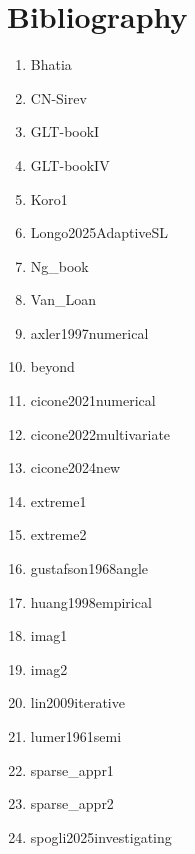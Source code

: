 \documentclass[11pt]{article}
\begin{document}
\section*{Bibliography}
\begin{enumerate}[leftmargin=*]
  \item Bhatia
  \item CN-Sirev
  \item GLT-bookI
  \item GLT-bookIV
  \item Koro1
  \item Longo2025AdaptiveSL
  \item Ng\_book
  \item Van\_Loan
  \item axler1997numerical
  \item beyond
  \item cicone2021numerical
  \item cicone2022multivariate
  \item cicone2024new
  \item extreme1
  \item extreme2
  \item gustafson1968angle
  \item huang1998empirical
  \item imag1
  \item imag2
  \item lin2009iterative
  \item lumer1961semi
  \item sparse\_appr1
  \item sparse\_appr2
  \item spogli2025investigating
\end{enumerate}

% 
% 
\end{document}
